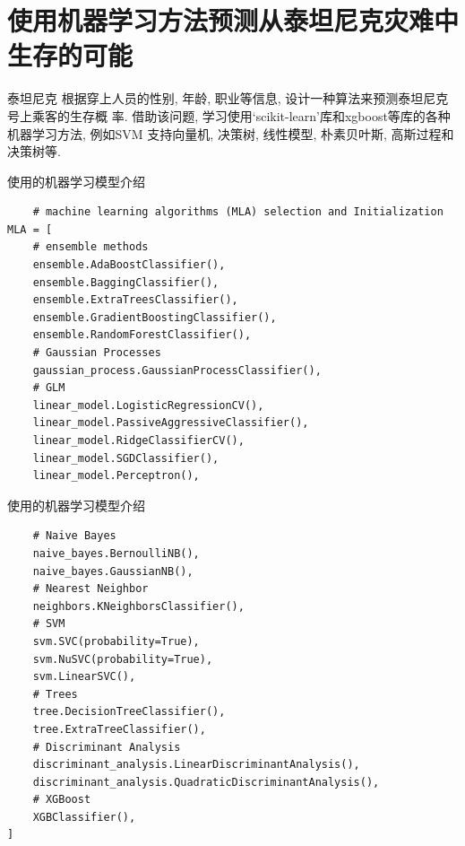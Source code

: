 \documentclass{beamer}
\begin{document}
\section{使用机器学习方法预测从泰坦尼克灾难中生存的可能}
\begin{frame}[fragile]{泰坦尼克}
	根据穿上人员的性别, 年龄, 职业等信息, 设计一种算法来预测泰坦尼克号上乘客的生存概
	率. 借助该问题, 学习使用`scikit-learn'库和xgboost等库的各种机器学习方法, 例如SVM
	支持向量机, 决策树, 线性模型, 朴素贝叶斯, 高斯过程和决策树等.
\end{frame}

\begin{frame}[fragile]{使用的机器学习模型介绍}
	\begin{verbatim}
	# machine learning algorithms (MLA) selection and Initialization
MLA = [
    # ensemble methods
    ensemble.AdaBoostClassifier(),
    ensemble.BaggingClassifier(),
    ensemble.ExtraTreesClassifier(),
    ensemble.GradientBoostingClassifier(),
    ensemble.RandomForestClassifier(),
    # Gaussian Processes
    gaussian_process.GaussianProcessClassifier(),
    # GLM
    linear_model.LogisticRegressionCV(),
    linear_model.PassiveAggressiveClassifier(),
    linear_model.RidgeClassifierCV(),
    linear_model.SGDClassifier(),
    linear_model.Perceptron(),
	\end{verbatim}
\end{frame}

\begin{frame}[fragile]{使用的机器学习模型介绍}
	\begin{verbatim}
    # Naive Bayes
    naive_bayes.BernoulliNB(),
    naive_bayes.GaussianNB(),
    # Nearest Neighbor
    neighbors.KNeighborsClassifier(),
    # SVM
    svm.SVC(probability=True),
    svm.NuSVC(probability=True),
    svm.LinearSVC(),
    # Trees
    tree.DecisionTreeClassifier(),
    tree.ExtraTreeClassifier(),
    # Discriminant Analysis
    discriminant_analysis.LinearDiscriminantAnalysis(),
    discriminant_analysis.QuadraticDiscriminantAnalysis(),
    # XGBoost
    XGBClassifier(),
]
	\end{verbatim}
\end{frame}
\end{document}
